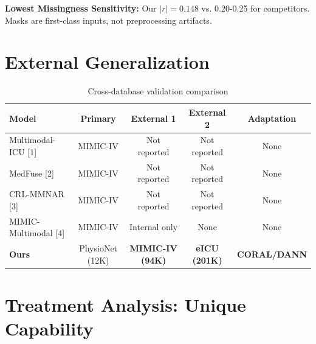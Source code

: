 \documentclass[11pt,a4paper]{article}
\renewcommand{\arraystretch}{1.25}
\begin{document}
\begin{leadingbox}
\textbf{Lowest Missingness Sensitivity:} Our $|r|=0.148$ vs. 0.20-0.25 for competitors. Masks are first-class inputs, not preprocessing artifacts.
\end{leadingbox}

\section{External Generalization}

\begin{table}[H]
\centering
\renewcommand{\arraystretch}{1.3}
\begin{tabular}{lcccc}
\toprule
\rowcolor{tableheader}
\textbf{Model} & \textbf{Primary} & \textbf{External 1} & \textbf{External 2} & \textbf{Adaptation} \\
\midrule
Multimodal-ICU [1] & MIMIC-IV & Not reported & Not reported & None \\
\rowcolor{lightbg}
MedFuse [2] & MIMIC-IV & Not reported & Not reported & None \\
CRL-MMNAR [3] & MIMIC-IV & Not reported & Not reported & None \\
\rowcolor{lightbg}
MIMIC-Multimodal [4] & MIMIC-IV & Internal only & None & None \\
\rowcolor{leading}
\textbf{Ours} & PhysioNet (12K) & \textbf{MIMIC-IV (94K)} & \textbf{eICU (201K)} & \textbf{CORAL/DANN} \\
\bottomrule
\end{tabular}
\caption{Cross-database validation comparison}
\end{table}

\section{Treatment Analysis: Unique Capability}
\end{document}
